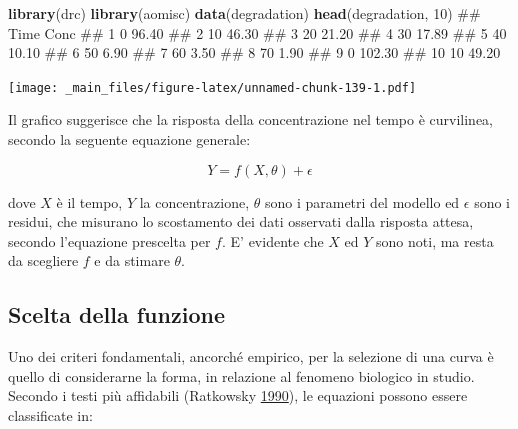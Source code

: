 \documentclass[a4paper,12pt,oneside]{book}
\newenvironment{Shaded}{\begin{snugshade}}{\end{snugshade}}
\newcommand{\KeywordTok}[1]{\textcolor[rgb]{0.13,0.29,0.53}{\textbf{#1}}}
\newcommand{\DecValTok}[1]{\textcolor[rgb]{0.00,0.00,0.81}{#1}}
\newcommand{\NormalTok}[1]{#1}
\theoremstyle{definition}
\theoremstyle{definition}
\theoremstyle{definition}
\theoremstyle{remark}
\begin{document}
\begin{Shaded}
\begin{Highlighting}[]
\KeywordTok{library}\NormalTok{(drc)}
\KeywordTok{library}\NormalTok{(aomisc)}
\KeywordTok{data}\NormalTok{(degradation)}
\KeywordTok{head}\NormalTok{(degradation, }\DecValTok{10}\NormalTok{)}
\NormalTok{##    Time   Conc}
\NormalTok{## 1     0  96.40}
\NormalTok{## 2    10  46.30}
\NormalTok{## 3    20  21.20}
\NormalTok{## 4    30  17.89}
\NormalTok{## 5    40  10.10}
\NormalTok{## 6    50   6.90}
\NormalTok{## 7    60   3.50}
\NormalTok{## 8    70   1.90}
\NormalTok{## 9     0 102.30}
\NormalTok{## 10   10  49.20}
\end{Highlighting}
\end{Shaded}

\texttt{[image: \_main\_files/figure-latex/unnamed-chunk-139-1.pdf]}

Il grafico suggerisce che la risposta della concentrazione nel tempo è
curvilinea, secondo la seguente equazione generale:

\[ Y = f(X, \theta) + \epsilon \]

dove \(X\) è il tempo, \(Y\) la concentrazione, \(\theta\) sono i
parametri del modello ed \(\epsilon\) sono i residui, che misurano lo
scostamento dei dati osservati dalla risposta attesa, secondo
l'equazione prescelta per \(f\). E' evidente che \(X\) ed \(Y\) sono
noti, ma resta da scegliere \(f\) e da stimare \(\theta\).

\subsection{Scelta della funzione}\label{scelta-della-funzione}

Uno dei criteri fondamentali, ancorché empirico, per la selezione di una
curva è quello di considerarne la forma, in relazione al fenomeno
biologico in studio. Secondo i testi più affidabili (Ratkowsky
\protect\hyperlink{ref-ratko1990Handbook}{1990}), le equazioni possono
essere classificate in:
\end{document}
